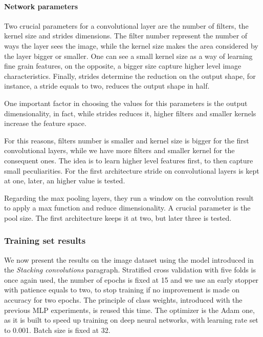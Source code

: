 \paragraph{Network parameters}
Two crucial parameters for a convolutional layer are the number of filters, 
the kernel size and strides dimensions. 
The filter number represent the number of ways the layer sees the image, 
while the kernel size makes the area 
considered by the layer bigger or smaller. One can see a small kernel size as a way 
of learning fine grain features, on the opposite, a bigger size capture higher level image characteristics.
Finally, strides determine the reduction on the output shape, for instance, a stride equals to 
two, reduces the output shape in half.

One important factor in choosing the values for this parameters is the output dimensionality, 
in fact, while strides reduces it, higher filters and smaller kernels increase 
the feature space.

For this reasons, filters number is smaller and kernel size is bigger for the first 
convolutional layers, while we have more filters and smaller kernel for the consequent ones.
The idea is to learn higher level features first, to then capture small peculiarities.
For the first architecture stride on convolutional layers is kept at one, later, an higher value is tested.

Regarding the max pooling layers, they run a window on the convolution result 
to apply a max function and reduce dimensionality. A crucial parameter is the pool size. The 
first architecture keeps it at two,  but later three is tested.

\subsubsection{Training set results}
We now present the results on the image dataset using the model introduced in 
the \emph{Stacking convolutions} paragraph. Stratified 
cross validation with five folds is once again used, the number of epochs 
is fixed at 15 and we use an early stopper with patience equals to two, to stop training 
if no improvement is made on accuracy for two epochs. The principle of 
class weights, introduced with the previous MLP experiments, is reused this time.
The optimizer is the Adam one, as it is built to speed up training on 
deep neural networks, with learning rate set to 0.001. Batch size is fixed at 32.

